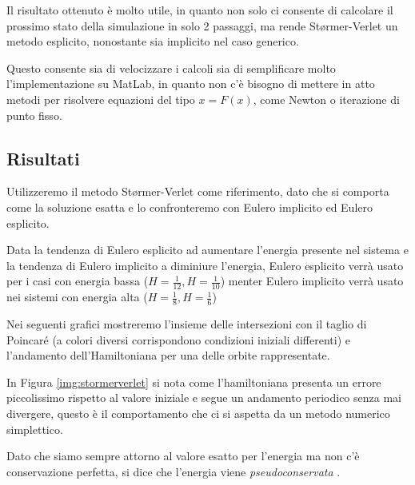 \documentclass[a4paper, 12pt]{article}
\numberwithin{equation}{section}
\numberwithin{figure}{section}
\begin{document}
Il risultato ottenuto è molto utile, in quanto non solo ci consente di calcolare il prossimo
stato della simulazione in solo 2 passaggi, ma rende Størmer-Verlet un metodo esplicito, nonostante
sia implicito nel caso generico.

Questo consente sia di velocizzare i calcoli sia di semplificare molto l'implementazione su MatLab, in
quanto non c'è bisogno di mettere in atto metodi per risolvere equazioni del tipo $x = F(x)$, come
Newton o iterazione di punto fisso.

\subsection{Risultati}
Utilizzeremo il metodo Størmer-Verlet come riferimento, dato che si comporta come la soluzione
esatta \cite{hairer} e lo confronteremo con Eulero implicito ed Eulero esplicito.

Data la tendenza di Eulero esplicito ad aumentare l'energia presente nel sistema e la tendenza
di Eulero implicito a diminiure l'energia, Eulero esplicito verrà usato per i casi con energia
bassa ($H=\frac{1}{12}, H=\frac{1}{10}$) menter Eulero implicito verrà usato nei sistemi con
energia alta ($H=\frac{1}{8}, H=\frac{1}{6}$)

Nei seguenti grafici mostreremo l'insieme delle intersezioni con il taglio di Poincaré (a colori
diversi corrispondono condizioni iniziali differenti) e l'andamento dell'Hamiltoniana per una delle
orbite rappresentate.

In Figura \ref{img:stormerverlet} si nota come l'hamiltoniana presenta un errore piccolissimo rispetto
al valore iniziale e segue un andamento periodico senza mai divergere, questo è il comportamento che 
ci si aspetta da un metodo numerico simplettico.

Dato che siamo sempre attorno al valore esatto per l'energia ma non c'è conservazione perfetta, si dice che
l'energia viene \textit{pseudoconservata} .
\end{document}
